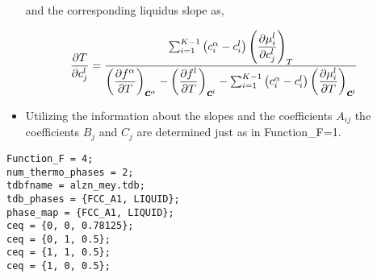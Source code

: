 \documentclass[a4paper,10pt]{article}
\newcommand{\vc}{\mbox{\boldmath{$c$}}}
\begin{document}
\begin{itemize}
 and the corresponding liquidus slope as, 
 
 \begin{align*}
  \dfrac{\partial T}{\partial c_j^{l}} &=  \dfrac{\sum_{i=1}^{K-1} \left(c_i^{\alpha} - c_i^{l}\right)\left(\dfrac{\partial \mu_i^{l}}{\partial c_j^{l}}\right)_T}{\left(\dfrac{\partial f^{\alpha}}{\partial T}\right)_{\vc^{\alpha}} 
  - \left(\dfrac{\partial f^l}{\partial T}\right)_{\vc^{l}} -  \sum_{i=1}^{K-1}\left(c_i^{\alpha} - c_i^{l}\right)\left(\dfrac{\partial \mu_i^{l}}{\partial T}\right)_{\vc^{l}}}
 \end{align*}
 
 \item Utilizing the information about the slopes and the coefficients $A_{ij}$ the coefficients $B_j$ and $C_j$ are determined just as in Function\_F=1.
\end{itemize}

\begin{lstlisting}
Function_F = 4;
num_thermo_phases = 2;
tdbfname = alzn_mey.tdb;
tdb_phases = {FCC_A1, LIQUID};
phase_map = {FCC_A1, LIQUID};
ceq = {0, 0, 0.78125};
ceq = {0, 1, 0.5};
ceq = {1, 1, 0.5};
ceq = {1, 0, 0.5};
\end{lstlisting}
\end{document}
